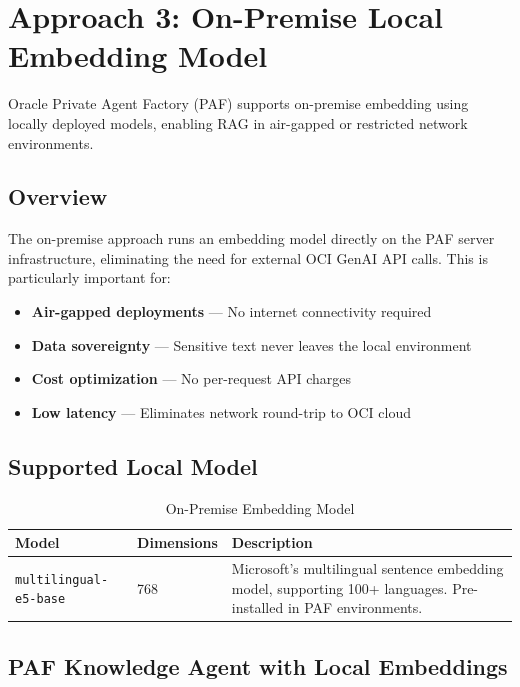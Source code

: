 \documentclass[12pt,a4paper]{article}
\begin{document}
\section{Approach 3: On-Premise Local Embedding Model}
\label{sec:onprem}

Oracle Private Agent Factory (PAF) supports on-premise embedding using locally deployed models, enabling RAG in air-gapped or restricted network environments.

\subsection{Overview}

The on-premise approach runs an embedding model directly on the PAF server infrastructure, eliminating the need for external OCI GenAI API calls. This is particularly important for:

\begin{itemize}
  \item \textbf{Air-gapped deployments} — No internet connectivity required
  \item \textbf{Data sovereignty} — Sensitive text never leaves the local environment
  \item \textbf{Cost optimization} — No per-request API charges
  \item \textbf{Low latency} — Eliminates network round-trip to OCI cloud
\end{itemize}

\subsection{Supported Local Model}

\begin{table}[H]
\centering
\caption{On-Premise Embedding Model}
\begin{tabularx}{\textwidth}{l l X}
\toprule
\textbf{Model} & \textbf{Dimensions} & \textbf{Description} \\
\midrule
\texttt{multilingual-e5-base} & 768 & Microsoft's multilingual sentence embedding model, supporting 100+ languages. Pre-installed in PAF environments. \\
\bottomrule
\end{tabularx}
\end{table}

\subsection{PAF Knowledge Agent with Local Embeddings}
\end{document}
